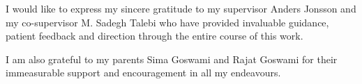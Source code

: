 

\begin{acknowledgement}

I would like to express my sincere gratitude to my supervisor Anders Jonsson and my co-supervisor M. Sadegh Talebi who have provided invaluable guidance, patient feedback and direction through the entire course of this work.

I am also grateful to my parents Sima Goswami and Rajat Goswami for their immeasurable support and encouragement in all my endeavours.


\newpage
\end{acknowledgement}